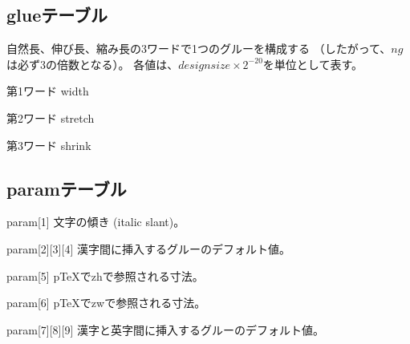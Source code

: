 \documentclass[twoside]{jarticle}
\begin{document}
\subsection{glueテーブル}
自然長、伸び長、縮み長の3ワードで1つのグルーを構成する
（したがって、$ng$は必ず3の倍数となる）。
各値は、$design size\times2^{-20}$を単位として表す。
\begin{description}
\item{第1ワード} width
\item{第2ワード} stretch
\item{第3ワード} shrink
\end{description}
%
\subsection{paramテーブル}
\begin{description}
\item{param[1]} 文字の傾き (italic slant)。
\item{param[2][3][4]} 漢字間に挿入するグルーのデフォルト値。
\item{param[5]} p\TeX{}でzhで参照される寸法。
\item{param[6]} p\TeX{}でzwで参照される寸法。
\item{param[7][8][9]} 漢字と英字間に挿入するグルーのデフォルト値。
\end{description}
%
\newpage
\end{document}

